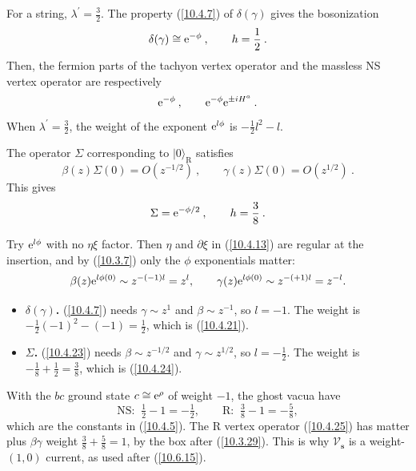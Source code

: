 	For a string, $\lambda^{\prime}=\frac{3}{2}$. The property (\ref{10.4.7}) of $\delta(\gamma)$ gives the bosonization
	\begin{equation}
		\delta(\gamma)\cong \mathrm{e}^{-\phi}\:, \qquad h=\frac{1}{2} \:. \label{10.4.21}
	\end{equation}
	Then, the fermion parts of the tachyon vertex operator and the massless NS vertex operator are respectively
	\begin{equation}
		\mathrm{e}^{-\phi} \:, \qquad \mathrm{e}^{-\phi} \mathrm{e}^{\pm i H^{a}}\:. \label{10.4.22}
	\end{equation}
	When $\lambda^{\prime}=\frac{3}{2}$, the weight of the exponent $\mathrm{e}^{l\phi}$ is $-\frac{1}{2}l^{2}-l$.
	
	The operator $\Sigma$ corresponding to $\lvert 0\rangle _{\mathrm{R}}$ satisfies
	\begin{equation}
		\beta(z)\Sigma(0) = O(z^{-1/2}) \:, \qquad \gamma(z)\Sigma(0) = O(z^{1/2}) \:. \label{10.4.23}
	\end{equation}
	This gives
	\begin{equation}
		\Sigma = \mathrm{e}^{-\phi/2} \:, \qquad h = \frac{3}{8} \: .\label{10.4.24}
	\end{equation}
	\begin{tcolorbox}[breakable]
		\begin{remark}
			Try $\mathrm{e}^{l\phi}$ with no $\eta\xi$ factor. Then $\eta$ and $\partial\xi$ in (\ref{10.4.13}) are regular at the insertion, and by (\ref{10.3.7}) only the $\phi$ exponentials matter:
			\begin{equation*}
				\beta(z)\mathrm{e}^{l\phi(0)}\sim z^{-(-1)l}=z^{l},\qquad \gamma(z)\mathrm{e}^{l\phi(0)}\sim z^{-(+1)l}=z^{-l}.
			\end{equation*}
			\begin{itemize}
				\item \textbf{$\delta(\gamma)$.} (\ref{10.4.7}) needs $\gamma\sim z^{1}$ and $\beta\sim z^{-1}$, so $l=-1$. The weight is $-\tfrac12(-1)^2-(-1)=\tfrac12$, which is (\ref{10.4.21}).
				\item \textbf{$\Sigma$.} (\ref{10.4.23}) needs $\beta\sim z^{-1/2}$ and $\gamma\sim z^{1/2}$, so $l=-\tfrac12$. The weight is $-\tfrac18+\tfrac12=\tfrac38$, which is (\ref{10.4.24}).
			\end{itemize}
			With the $bc$ ground state $c\cong\mathrm{e}^{\rho}$ of weight $-1$, the ghost vacua have
			\begin{equation*}
				\text{NS: }\ \tfrac12-1=-\tfrac12,\qquad \text{R: }\ \tfrac38-1=-\tfrac58,
			\end{equation*}
			which are the constants in (\ref{10.4.5}). The R vertex operator (\ref{10.4.25}) has matter plus $\beta\gamma$ weight $\tfrac38+\tfrac58=1$, by the box after (\ref{10.3.29}). This is why $\mathscr V_{\mathbf s}$ is a weight-$(1,0)$ current, as used after (\ref{10.6.15}).
		\end{remark}
	\end{tcolorbox}
